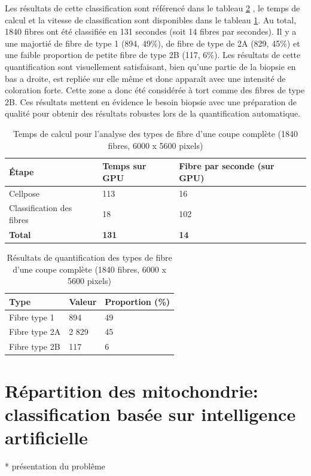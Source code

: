 Les résultats de cette classification sont référencé dans le tableau \ref{tab:atp_wsi_resultstable} , le temps de calcul et la vitesse de classification sont disponibles dans le tableau \ref{tab:atp_wsi_timetable}. Au total, 1840 fibres ont été classifiée en 131 secondes (soit 14 fibres par secondes). Il y a une majortié de fibre de type 1 (894, 49\%), de fibre de type de 2A (829, 45\%) et une faible proportion de petite fibre de type 2B (117, 6\%). Les résultats de cette quantification sont visuellement satisfaisant, bien qu'une partie de la biopsie en bas a droite, est repliée sur elle même et donc apparaît avec une intensité de coloration forte. Cette zone a donc été considérée à tort comme des fibres de type 2B. Ces résultats mettent en évidence le besoin biopsie avec une préparation de qualité pour obtenir des résultats robustes lors de la quantification automatique.

\begin{table}[ht]
\centering
\caption{Temps de calcul pour l'analyse des types de fibre d'une coupe complète (1840 fibres, 6000 x 5600 pixels)}
\label{tab:atp_wsi_timetable}
\begin{tabularx}{\textwidth}{|X|X|X|}
\hline
\textbf{Étape} & \textbf{Temps sur GPU} & \textbf{Fibre par seconde (sur GPU)} \\
\toprule
Cellpose & 113 & 16 \\
\hline
Classification des fibres & 18 & 102 \\
\hline
\textbf{Total} & \textbf{131} & \textbf{14} \\
\hline
\end{tabularx}
\end{table}
\begin{table}[ht]
\centering
\caption{Résultats de quantification des types de fibre d'une coupe complète (1840 fibres, 6000 x 5600 pixels)}
\label{tab:atp_wsi_resultstable}
\begin{tabularx}{\textwidth}{|X|X|X|}
\hline
\textbf{Type} & \textbf{Valeur} & \textbf{Proportion (\%)} \\
\toprule
Fibre type 1 & 894 & 49 \\
\hline
Fibre type 2A & 2 829 & 45 \\
\hline
Fibre type 2B & 117 & 6 \\
\hline
\end{tabularx}
\end{table}


\section{Répartition des mitochondrie: classification basée sur intelligence artificielle}
* présentation du problême
